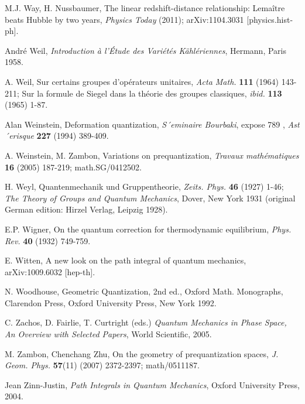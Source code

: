 \documentclass[12pt]{article}
\begin{document}
\begin{thebibliography}{000}
 M.J. Way, H. Nussbaumer, The linear redshift-distance relationship: Lema\^itre
beats Hubble by two years, {\it Physics Today} (2011); arXiv:1104.3031 [physics.hist-ph].

 Andr\'e Weil, {\it Introduction \`a l'\'Etude des Vari\'et\'es K\"ahl\'eriennes},
Hermann, Paris 1958.

 A. Weil, Sur certains groupes d’op\'erateurs unitaires, {\it Acta Math.} {\bf 111}
(1964) 143-211; Sur la formule de Siegel dans la th\'eorie des groupes classiques, {\it ibid.} 
{\bf 113} (1965) 1-87.

 Alan Weinstein, Deformation quantization, {\it S´eminaire Bourbaki}, expose 789 , {\it Ast´erisque} {\bf 227} (1994) 389-409.

 A. Weinstein, M. Zambon, Variations on prequantization, {\it
Travaux math\'ematiques} {\bf 16} (2005) 187-219; math.SG/0412502.

 H. Weyl, Quantenmechanik und Gruppentheorie, {\it Zeits. Phys.} {\bf 46} (1927) 1-46; {\it The Theory of Groups and 
Quantum Mechanics}, Dover, New York 1931 (original German edition: Hirzel Verlag, Leipzig 1928).

 E.P. Wigner, On the quantum correction for thermodynamic equilibrium, {\it Phys. Rev.} {\bf 40} (1932) 749-759.

 E. Witten, A new look on the path integral of quantum mechanics, arXiv:1009.6032 [hep-th].

 N. Woodhouse, {Geometric Quantization}, 2nd ed., Oxford Math. Monographs, Clarendon
Press, Oxford University Press, New York 1992.

 C. Zachos, D. Fairlie, T. Curtright (eds.) {\it Quantum Mechanics in Phase Space, An
Overview with Selected Papers}, World Scientific, 2005.

 M. Zambon, Chenchang Zhu, On the geometry of prequantization
spaces, {\it J. Geom. Phys.} {\bf 57}(11) (2007) 2372-2397; math/0511187.

 Jean Zinn-Justin, {\it Path Integrals in Quantum Mechanics}, Oxford University Press, 2004.

\end{thebibliography}
\end{document}
